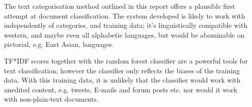 \documentclass[11pt]{article}
\begin{document}
The text categorisation method outlined in this report offers a plausible first
attempt at document classification. The system developed is likely to work with
independently of categories, and training data; it's linguistically compatible
with western, and maybe even all alphabetic languages, but would be abominable
on pictorial, e.g. East Asian, languages. 

TF*IDF scores together with the random forest classifier are a powerful tools
for text classification; however the classifier only reflects the biases of the
training data. With this training data, it is unlikely that the classifier
would work with unedited content, e.g.  tweets, E-mails and forum posts etc.
nor would it work with non-plain-text documents.



\nocite{*}
\end{document}
